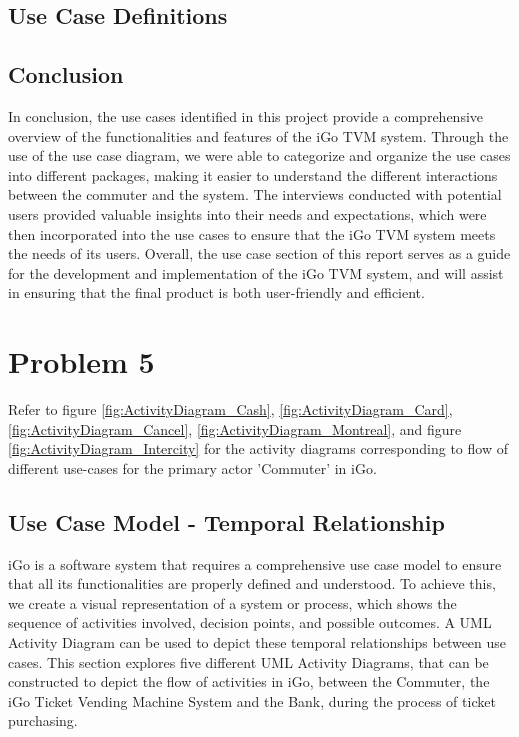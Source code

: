 \documentclass[letterpaper]{report}
\begin{document}
\section{Use Case Definitions}


\section{Conclusion}
In conclusion, the use cases identified in this project provide a comprehensive overview of the functionalities and features of the iGo TVM system. Through the use of the use case diagram, we were able to categorize and organize the use cases into different packages, making it easier to understand the different interactions between the commuter and the system. The interviews conducted with potential users provided valuable insights into their needs and expectations, which were then incorporated into the use cases to ensure that the iGo TVM system meets the needs of its users. Overall, the use case section of this report serves as a guide for the development and implementation of the iGo TVM system, and will assist in ensuring that the final product is both user-friendly and efficient.

\chapter{Problem 5}
Refer to figure \ref{fig:ActivityDiagram_Cash},  \ref{fig:ActivityDiagram_Card}, \ref{fig:ActivityDiagram_Cancel},  \ref{fig:ActivityDiagram_Montreal}, and figure \ref{fig:ActivityDiagram_Intercity} for the activity diagrams corresponding to flow of different use-cases for the primary actor 'Commuter' in iGo.

\section{Use Case Model - Temporal Relationship}
iGo is a software system that requires a comprehensive use case model to ensure that all its functionalities are properly defined and understood. To achieve this, we create a visual representation of a system or process, which shows the sequence of activities involved, decision points, and possible outcomes. A UML Activity Diagram can be used to depict these temporal relationships between use cases. This section explores five different UML Activity Diagrams, that can be constructed to depict the flow of activities in iGo, between the Commuter, the iGo Ticket Vending Machine System and the Bank, during the process of ticket purchasing.
\end{document}
